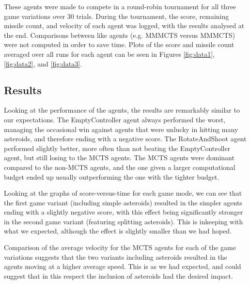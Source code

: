 These agents were made to compete in a round-robin tournament for all three game variations over 30 trials. During the tournament, the score, remaining missile count, and velocity of each agent was logged, with the results analysed at the end. Comparisons between like agents (e.g. MMMCTS versus MMMCTS) were not computed in order to save time. Plots of the score and missile count averaged over all runs for each agent can be seen in Figures \ref{fig:data1}, \ref{fig:data2}, and \ref{fig:data3}.

\subsection{Results}

Looking at the performance of the agents, the results are remarkably similar to our expectations. The EmptyController agent always performed the worst, managing the occasional win against agents that were unlucky in hitting many asteroids, and therefore ending with a negative score. The RotateAndShoot agent performed slightly better, more often than not beating the EmptyController agent, but still losing to the MCTS agents. The MCTS agents were dominant compared to the non-MCTS agents, and the one given a larger computational budget ended up usually outperforming the one with the tighter budget.

Looking at the graphs of score-versus-time for each game mode, we can see that the first game variant (including simple asteroids) resulted in the simpler agents ending with a slightly negative score, with this effect being significantly stronger in the second game variant (featuring splitting asteroids). This is inkeeping with what we expected, although the effect is slightly smaller than we had hoped.

Comparison of the average velocity for the MCTS agents for each of the game variations suggests that the two variants including asteroids resulted in the agents moving at a higher average speed. This is as we had expected, and could suggest that in this respect the inclusion of asteroids had the desired impact.

